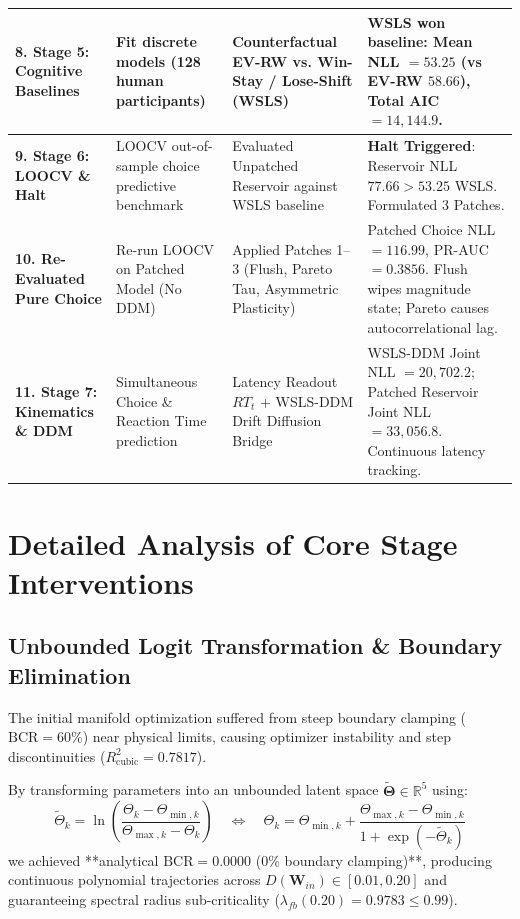 \documentclass[11pt,a4paper]{article}
\begin{document}
\begin{table}[H]
\begin{tabular}{p{2.2cm} p{4.2cm} p{4.2cm} p{4.2cm}}
\midrule
\textbf{8. Stage 5: Cognitive Baselines} & Fit discrete models (128 human participants) & Counterfactual EV-RW vs. Win-Stay / Lose-Shift (WSLS) & \textbf{WSLS won baseline}: Mean NLL $= 53.25$ (vs EV-RW $58.66$), Total AIC $= 14,144.9$. \\
\midrule
\textbf{9. Stage 6: LOOCV \& Halt} & LOOCV out-of-sample choice predictive benchmark & Evaluated Unpatched Reservoir against WSLS baseline & \textbf{Halt Triggered}: Reservoir NLL $77.66 > 53.25$ WSLS. Formulated 3 Patches. \\
\midrule
\textbf{10. Re-Evaluated Pure Choice} & Re-run LOOCV on Patched Model (No DDM) & Applied Patches 1--3 (Flush, Pareto Tau, Asymmetric Plasticity) & Patched Choice NLL $= 116.99$, PR-AUC $= 0.3856$. Flush wipes magnitude state; Pareto causes autocorrelational lag. \\
\midrule
\textbf{11. Stage 7: Kinematics \& DDM} & Simultaneous Choice \& Reaction Time prediction & Latency Readout $RT_t$ + WSLS-DDM Drift Diffusion Bridge & WSLS-DDM Joint NLL $= 20,702.2$; Patched Reservoir Joint NLL $= 33,056.8$. Continuous latency tracking. \\
\bottomrule
\end{tabular}
\end{table}

\section{Detailed Analysis of Core Stage Interventions}

\subsection{Unbounded Logit Transformation \& Boundary Elimination}
The initial manifold optimization suffered from steep boundary clamping ($\text{BCR} = 60\%$) near physical limits, causing optimizer instability and step discontinuities ($R^2_{\text{cubic}} = 0.7817$). 

By transforming parameters into an unbounded latent space $\tilde{\boldsymbol{\Theta}} \in \mathbb{R}^5$ using:
\begin{equation}
\tilde{\Theta}_k = \ln \left( \frac{\Theta_k - \Theta_{\min, k}}{\Theta_{\max, k} - \Theta_k} \right) \quad \Longleftrightarrow \quad \Theta_k = \Theta_{\min, k} + \frac{\Theta_{\max, k} - \Theta_{\min, k}}{1 + \exp(-\tilde{\Theta}_k)}
\end{equation}
we achieved **analytical $\text{BCR} = 0.0000$ (0\% boundary clamping)**, producing continuous polynomial trajectories across $D(\mathbf{W}_{in}) \in [0.01, 0.20]$ and guaranteeing spectral radius sub-criticality ($\lambda_{fb}(0.20) = 0.9783 \le 0.99$).
\end{document}
